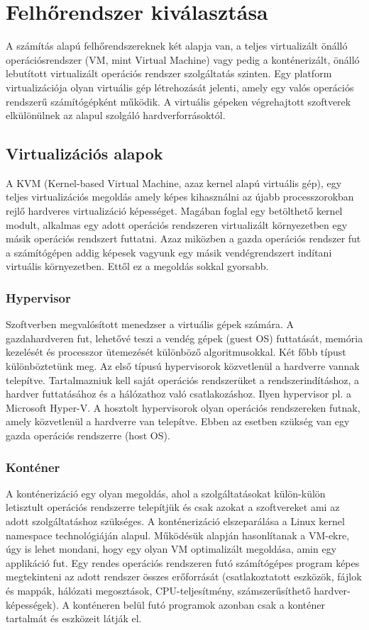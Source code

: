 \chapter{Felhőrendszer kiválasztása}
\label{cha:cloud}
A számítás alapú felhőrendszereknek két alapja van, a teljes virtualizált önálló operációsrendszer (VM, mint Virtual Machine) vagy pedig a konténerizált, önálló lebutított virtualizált operációs rendszer szolgáltatás szinten.
Egy platform virtualizációja olyan virtuális gép létrehozását jelenti, amely egy valós operációs rendszerű számítógépként működik. A virtuális gépeken végrehajtott szoftverek elkülönülnek az alapul szolgáló hardverforrásoktól.

\section{Virtualizációs alapok}
A KVM (Kernel-based Virtual Machine, azaz kernel alapú virtuális gép), egy teljes
virtualizációs megoldás amely képes kihasználni az újabb processzorokban rejlő hardveres
virtualizáció képességet. Magában foglal egy betölthető kernel modult, alkalmas egy adott operációs rendszeren virtualizált környezetben egy másik operációs rendszert futtatni. Azaz miközben a gazda operációs rendszer fut a számítógépen addig képesek vagyunk egy másik vendégrendszert indítani virtuális környezetben. Ettől ez a megoldás sokkal gyorsabb.



\subsection{Hypervisor}
Szoftverben megvalósított menedzser a virtuális gépek számára. A gazdahardveren fut,
lehetővé teszi a vendég gépek (guest OS) futtatását, memória kezelését és processzor ütemezését különböző
algoritmusokkal. Két főbb típust különböztetünk meg. 
Az első típusú hypervisorok közvetlenül a hardverre vannak telepítve.
Tartalmazniuk kell saját operációs rendszerüket a rendszerindításhoz, a hardver futtatásához és a
hálózathoz való csatlakozáshoz. Ilyen hypervisor pl. a Microsoft Hyper-V. 
A hosztolt hypervisorok olyan operációs rendszereken futnak, amely közvetlenül a hardverre van telepítve. Ebben az esetben szükség van egy gazda operációs rendszerre (host OS).
\subsection{Konténer}
A konténerizáció egy olyan megoldás, ahol a szolgáltatásokat külön-külön letisztult operációs rendszerre telepítjük és csak azokat a szoftvereket ami az adott szolgáltatáshoz szükséges. A konténerizáció elszeparálása a Linux kernel namespace technológiáján alapul. Működésük alapján hasonlítanak a VM-ekre, úgy is lehet mondani, hogy egy olyan VM optimalizált megoldása, amin egy applikáció fut. Egy rendes operációs rendszeren futó számítógépes program képes megtekinteni az adott rendszer összes erőforrását (csatlakoztatott eszközök, fájlok és mappák, hálózati megosztások, CPU-teljesítmény, számszerűsíthető hardver-
képességek). A konténeren belül futó programok azonban csak a konténer tartalmát és eszközeit látják el.
